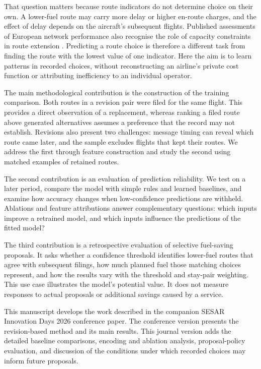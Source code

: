 \documentclass[preprint,authoryear,12pt]{elsarticle}
\begin{document}
That question matters because route indicators do not determine choice
on their own. A lower-fuel route may carry more delay or higher en-route
charges, and the effect of delay depends on the aircraft's subsequent
flights. Published assessments of European network performance also
recognise the role of capacity constraints in route extension
\citep{prc2026}. Predicting a route choice is therefore a different task
from finding the route with the lowest value of one indicator. Here the
aim is to learn patterns in recorded choices, without reconstructing
an airline's private cost function or attributing inefficiency to an
individual operator.

The main methodological contribution is the construction of the training
comparison. Both routes in a revision pair were filed for the same
flight. This provides a direct observation of a replacement, whereas
ranking a filed route above generated alternatives assumes a preference
that the record may not establish. Revisions also present two challenges:
message timing can reveal which route came later, and the sample excludes
flights that kept their routes. We address the first through feature
construction and study the second using matched examples of retained
routes.

The second contribution is an evaluation of prediction reliability.
We test on a later period, compare the model with simple rules and
learned baselines, and examine how accuracy changes when low-confidence
predictions are withheld. Ablations and feature attributions answer
complementary questions: which inputs improve a retrained model, and
which inputs influence the predictions of the fitted model?

The third contribution is a retrospective evaluation of selective
fuel-saving proposals. It asks whether a confidence threshold identifies
lower-fuel routes that agree with subsequent filings, how much planned
fuel those matching choices represent, and how the results vary with the
threshold and stay-pair weighting. This use case illustrates the model's
potential value. It does not measure responses to actual proposals or
additional savings caused by a service.

This manuscript develops the work described in the companion SESAR
Innovation Days 2026 conference paper. The conference version presents
the revision-based method and its main results. This journal version
adds the detailed baseline comparisons, encoding and ablation analysis,
proposal-policy evaluation, and discussion of the conditions under which
recorded choices may inform future proposals.
\end{document}
